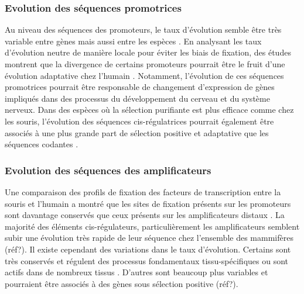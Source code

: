 \subsubsection{Evolution des séquences promotrices}
\label{subsubsec:evol-seq-promo}

Au niveau des séquences des promoteurs, le taux d’évolution semble être très variable entre gènes mais aussi entre les espèces \citep{taylor_heterotachy_2006}. En analysant les taux d’évolution neutre de manière locale pour éviter les biais de fixation, des études montrent que la divergence de certains promoteurs pourrait être le fruit d’une évolution adaptative chez l’humain \citep{haygood_promoter_2007, torgerson_evolutionary_2009}. Notamment, l’évolution de ces séquences promotrices pourrait être responsable de changement d’expression de gènes impliqués dans des processus du développement du cerveau et du système nerveux. Dans des espèces où la sélection purifiante est plus efficace comme chez les souris, l’évolution des séquences \gls{cis}-régulatrices pourrait également être associés à une plus grande part de sélection positive et adaptative que les séquences codantes \citep{halligan_contributions_2013}.

\subsubsection{Evolution des séquences des \glspl{amplificateur}}
\label{subsubsec:evol-seq-enh}

Une comparaison des profils de fixation des facteurs de transcription entre la souris et l’humain a montré que les sites de fixation présents sur les promoteurs sont davantage conservés que ceux présents sur les \glspl{amplificateur} distaux \citep{cheng_principles_2014}. La majorité des éléments \gls{cis}-régulateurs, particulièrement les \glspl{amplificateur} semblent subir une évolution très rapide de leur séquence chez l’ensemble des mammifères (réf?). Il existe cependant des variations dans le taux d’évolution. Certains sont très conservés et régulent des processus fondamentaux tissu-spécifiques \citep{ballester_multi-species_2014} ou sont actifs dans de nombreux tissus \citep{cheng_principles_2014}. D’autres sont beaucoup plus variables et pourraient être associés à des gènes sous sélection positive (réf?). 

